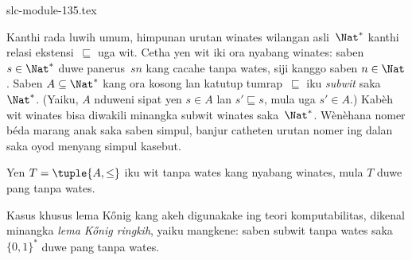 \begin{filecontents*}[overwrite]{slc-module-135.tex}
\begin{ex}
Kanthi rada luwih umum, himpunan urutan winates
wilangan asli~$\Nat^*$ kanthi relasi
ekstensi~$\sqsubseteq$ uga wit.
Cetha yen wit iki ora nyabang winates:
saben $s \in \Nat^*$ duwe panerus~$sn$
kang cacahe tanpa wates, siji kanggo saben
$n \in \Nat$.
Saben $A\subseteq \Nat^*$ kang ora kosong lan katutup
tumrap~$\sqsubseteq$ iku \emph{subwit}
saka~$\Nat^*$.
(Yaiku, $A$ nduweni sipat yen $s \in A$
lan $s' \sqsubseteq s$, mula uga $s' \in A$.)
Kabèh wit winates bisa diwakili minangka subwit winates saka~$\Nat^*$.
Wènèhana nomer béda marang anak saka saben simpul, banjur catheten
urutan nomer ing dalan saka oyod menyang simpul kasebut.
\end{ex}

\begin{prop}
Yen $T = \tuple{A,\le}$ iku wit tanpa wates
kang nyabang winates, mula $T$
duwe pang tanpa wates.
\end{prop}

Kasus khusus lema K\H{o}nig kang akeh digunakake
ing teori komputabilitas, dikenal minangka
\emph{lema K\H{o}nig ringkih}, yaiku mangkene:
saben subwit tanpa wates saka $\{0,1\}^*$
duwe pang tanpa wates.


\end{filecontents*}


